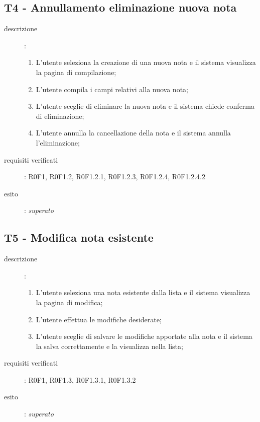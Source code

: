 \subsection{T4 - Annullamento eliminazione nuova nota}
\begin{description}
\item[descrizione]: \hfill
	\begin{enumerate}
	\item L'utente seleziona la creazione di una nuova nota e il sistema visualizza la pagina di compilazione;
	\item L'utente compila i campi relativi alla nuova nota;
	\item L'utente sceglie di eliminare la nuova nota e il sistema chiede conferma di eliminazione;
	\item L'utente annulla la cancellazione della nota e il sistema annulla l'eliminazione;
	\end{enumerate}
\item[requisiti verificati]: R0F1, R0F1.2, R0F1.2.1, R0F1.2.3, R0F1.2.4, R0F1.2.4.2
\item[esito]: \emph{superato}
\end{description}

\subsection{T5 - Modifica nota esistente}
\begin{description}
\item[descrizione]: \hfill
	\begin{enumerate}
	\item L'utente seleziona una nota esistente dalla lista e il sistema visualizza la pagina di modifica;
	\item L'utente effettua le modifiche desiderate;
	\item L'utente sceglie di salvare le modifiche apportate alla nota e il sistema la salva correttamente e la visualizza nella lista;
	\end{enumerate}
\item[requisiti verificati]: R0F1, R0F1.3, R0F1.3.1, R0F1.3.2
\item[esito]: \emph{superato}
\end{description}

